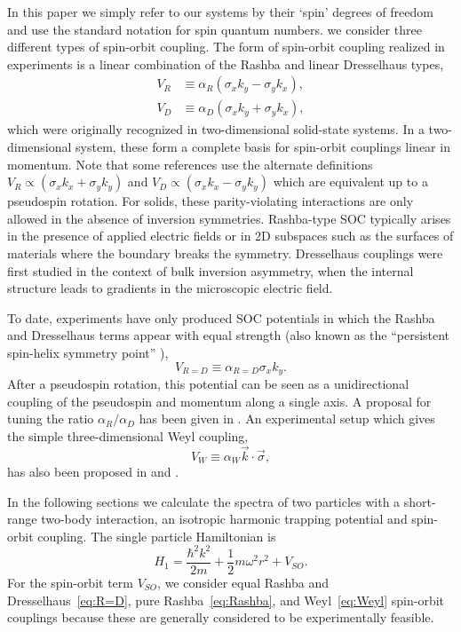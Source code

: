 \documentclass[%
 notitlepage,
 preprint,
showpacs,%
 amsmath,amssymb,
 aps,
pra,
]{revtex4-1}
\begin{document}
In this paper we simply refer to our systems by their `spin' degrees of freedom and use the standard notation for spin quantum numbers. we consider three different types of spin-orbit coupling. The form of spin-orbit coupling realized in experiments is a linear combination of the Rashba \cite{0022-3719-17-33-015} and linear Dresselhaus \cite{PhysRev.100.580} types,
\begin{align}
V_{R}&\equiv\alpha_R (\sigma_x k_y-\sigma_y k_x) \label{eq:Rashba},\\
V_{D}&\equiv\alpha_D (\sigma_x k_y+\sigma_y k_x) \label{eq:Dresselhaus},
\end{align} 
which were originally recognized in two-dimensional solid-state systems. In a two-dimensional system, these form a complete basis for spin-orbit couplings linear in momentum. Note that some references use the alternate definitions $V_R\propto  (\sigma_x k_x+\sigma_y k_y) $ and $V_D\propto  (\sigma_x k_x-\sigma_y k_y) $ which are equivalent up to a pseudospin rotation.  For solids, these parity-violating interactions are only allowed in the absence of inversion symmetries. Rashba-type SOC typically arises in the presence of applied electric fields or in 2D subspaces such as the surfaces of materials where the boundary breaks the symmetry. Dresselhaus couplings were first studied in the context of bulk inversion asymmetry, when the internal structure leads to gradients in the microscopic electric field. 

To date, experiments have only produced SOC potentials in which the Rashba and Dresselhaus terms appear with equal strength (also known as the ``persistent spin-helix symmetry point'' \cite{PhysRevLett.97.236601}), 
\begin{equation}
\label{eq:R=D}
V_{R=D}\equiv\alpha_{R=D}\sigma_x k_y.
\end{equation} 
After a pseudospin rotation, this potential can be seen as a unidirectional coupling of the pseudospin and momentum along a single axis. A proposal for tuning the ratio $\alpha_R/\alpha_D$ has been given in \cite{PhysRevA.84.025602}.  An experimental setup which gives the simple three-dimensional Weyl coupling,
\begin{equation}\label{eq:Weyl}
V_{W}\equiv\alpha_W \vec{k}\cdot\vec{\sigma},
\end{equation}
has also been proposed in \cite{PhysRevLett.108.235301} and \cite{PhysRevLett.111.125301}. 

In the following sections we calculate the spectra of two particles with a short-range two-body interaction, an isotropic harmonic trapping potential and spin-orbit coupling. The single particle Hamiltonian is 
\begin{equation}\label{eq:shortRangeInteraction}
H_1=\frac{\hbar^2 k^2}{2m}+\frac{1}{2}m\omega^2 r^2 + V_{SO}.
\end{equation}
For the spin-orbit term $V_{SO}$, we consider equal Rashba and Dresselhaus~\eqref{eq:R=D}, pure Rashba~\eqref{eq:Rashba}, and Weyl~\eqref{eq:Weyl} spin-orbit couplings  because these are generally considered to be experimentally feasible.
\end{document}
